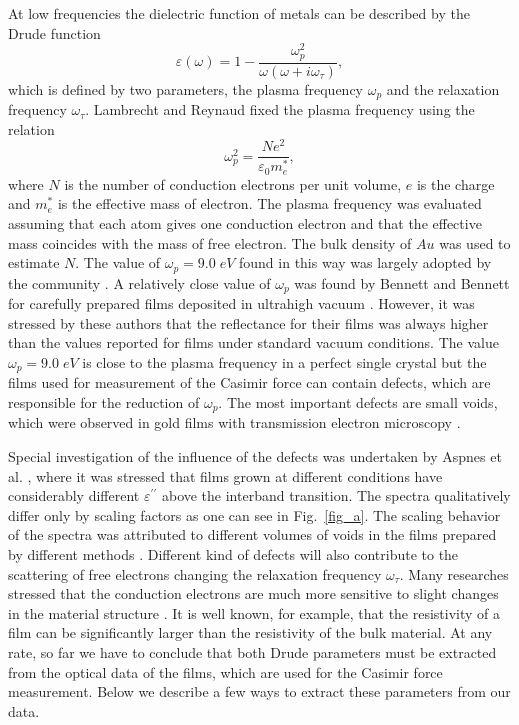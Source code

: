 \documentclass[prb]{revtex4}%
\begin{document}
At low frequencies the dielectric function of metals can be
described by the Drude function
%
\begin{equation}
\varepsilon \left( \omega \right) =1-\frac{\omega _{p}^{2}}{\omega
\left( \omega +i\omega _{\tau }\right) },  \label{Drude}
\end{equation}
%
which is defined by two parameters, the plasma frequency $\omega
_{p}$ and the relaxation frequency $\omega _{\tau }$. Lambrecht and
Reynaud \cite{Lam00} fixed the plasma frequency using the relation
%
\begin{equation}
\omega _{p}^{2}=\frac{Ne^{2}}{\varepsilon _{0}m_{e}^{\ast }},
\label{Omp}
\end{equation}
%
where $N$ is the number of conduction electrons per unit volume, $e
$ is the charge and $m_{e}^{\ast }$ is the effective mass of
electron. The plasma frequency was evaluated assuming that each atom
gives one conduction electron and that the effective mass coincides
with the mass of free electron. The bulk density of $Au$ was used to
estimate $N$. The value of $\omega_p=9.0\;eV$ found in this way was
largely adopted by the community
\cite{Har00,Ede00,Cha01,Bres02,Dec03a,Dec03b,Dec05}. A relatively
close value of $\omega_p$ was found by Bennett and Bennett
\cite{Ben66} for carefully prepared films deposited in ultrahigh
vacuum \cite{Ben65}. However, it was stressed by these authors that
the reflectance for their films was always higher than the values
reported for films under standard vacuum conditions. The value
$\omega_p=9.0\;eV$ is close to the plasma frequency in a perfect
single crystal but the films used for measurement of the Casimir
force can contain defects, which are responsible for the reduction
of $\omega_p$. The most important defects are small voids, which
were observed in gold films with transmission electron microscopy
\cite{Llo77a,Llo77b}.

Special investigation of the influence of the defects was undertaken
by Aspnes et al. \cite{Asp80}, where it was stressed that films
grown at different conditions have considerably different
$\varepsilon^{\prime\prime}$ above the interband transition. The
spectra qualitatively differ only by scaling factors as one can see
in Fig.~\ref{fig_a}. The scaling behavior of the spectra was
attributed to different volumes of voids in the films prepared by
different methods \cite{Asp80}. Different kind of defects will also
contribute to the scattering of free electrons changing the
relaxation frequency $\omega_{\tau}$. Many researches stressed that
the conduction electrons are much more sensitive to slight changes
in the material structure \cite{Ben65,Asp80,The70,Kai02}. It is well
known, for example, that the resistivity of a film can be
significantly larger than the resistivity of the bulk material. At
any rate, so far we have to conclude that both Drude parameters must
be extracted from the optical data of the films, which are used for
the Casimir force measurement. Below we describe a few ways to
extract these parameters from our data.
\end{document}
